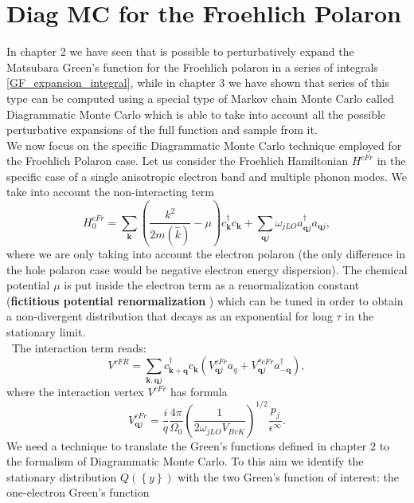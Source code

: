 \section{Diag MC for the Froehlich Polaron}
In chapter 2 we have seen that is possible to perturbatively expand the Matsubara Green's function for the Froehlich polaron 
in a series of integrals \ref{GF_expansion_integral}, while in chapter 3 we have shown that series of this type can be computed 
using a special type of Markov chain Monte Carlo called Diagrammatic Monte Carlo which is able to take into account all the possible 
perturbative expansions of the full function and sample from it.\\
We now focus on the specific Diagrammatic Monte Carlo technique employed for the Froehlich Polaron case. Let us consider the 
Froehlich Hamiltonian $H^{cFr}$ in the specific case of a single anisotropic electron band and multiple phonon modes. We take into account 
the non-interacting term
\begin{equation}
    H^{cFr}_0=\sum_{\mathbf{k}}\left(\frac{k^2}{2m(\hat{k})}-\mu\right)c^\dagger_{\mathbf{k}}c_{\mathbf{k}}+\sum_{\mathbf{q}j}\omega_{jLO}a^\dagger_{\mathbf{q}j}a_{\mathbf{q}j},
\end{equation}
where we are only taking into account the electron polaron (the only difference in the hole polaron case would be negative electron energy dispersion). The chemical potential 
$\mu$ is put inside the electron term as a renormalization constant (\textbf{fictitious potential renormalization} \cite{mishchenko2000diagrammatic})\cite{fehske2007computational} which can be tuned in order to obtain a non-divergent distribution that decays 
as an exponential for long $\tau$ in the stationary limit.\\\
The interaction term reads:
\begin{equation}
    V^{cFR}=\sum_{\mathbf{k},\mathbf{q}j}c^\dagger_{\mathbf{k+q}}c_{\mathbf{k}}\left(V^{cFr}_{\mathbf{q}j}a_q+V^{*cFr}_{\mathbf{q}j}a^\dagger_{-\mathbf{q}}\right),
\end{equation}
where the interaction vertex $V^{cFr}$ has formula
\begin{equation}
    V^{cFr}_{\mathbf{q}j}=\frac{i}{q}\frac{4\pi}{\Omega_0}\left(\frac{1}{2\omega_{jLO}V_{BvK}}\right)^{1/2}\frac{p_j}{\epsilon^{\infty}}.
\end{equation}
We need a technique to translate the Green's functions defined in chapter 2 to the formalism of Diagrammatic Monte Carlo. To this aim 
we identify the stationary distribution $Q(\left\{y\right\})$ with the two Green's function of interest: the one-electron Green's function 
